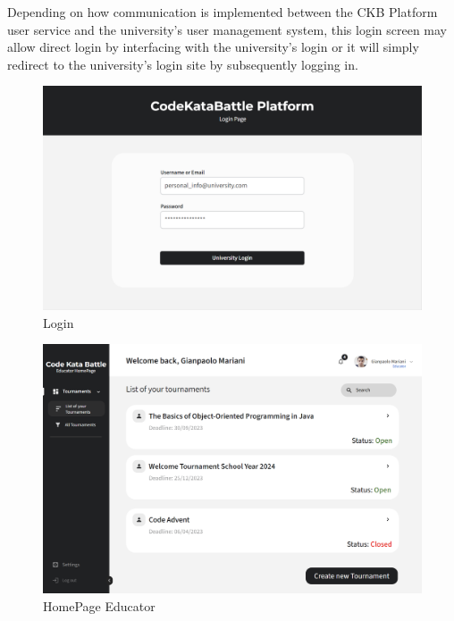 
Depending on how communication is implemented between the CKB Platform user service and the university's user management system,
this login screen may allow direct login by interfacing with the university's login or it will simply redirect to the university's login site by subsequently logging in.
\begin{figure}[H]
    \centering
    \includegraphics[width=\textwidth]{../images/login.png}
    \caption{Login}
    \label{fig:Login}
\end{figure}
\begin{figure}[H]
    \centering
    \includegraphics[width=\textwidth]{../images/homepage-educator.png}
    \caption{HomePage Educator}
    \label{fig:HomePage Educator}
\end{figure}
